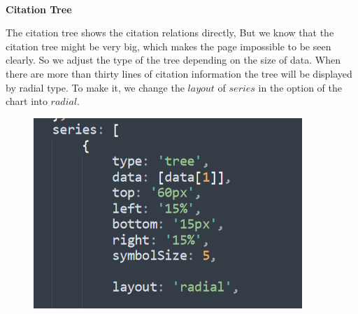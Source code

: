 \documentclass{article}
\begin{document}
	\\
	\textbf{Citation Tree}
	\par The citation tree shows the citation relations directly, But we know that the citation tree might be very big, which makes the page impossible to be seen clearly. So we adjust the type of the tree depending on the size of data. When there are more than thirty lines of citation information the tree will be displayed by radial type. To make it, we change the \(layout\) of \(series\) in the option of the chart into \(radial\).
	\begin{figure}[H]
		\centering
		\includegraphics[width=0.25\linewidth]{P_37.png}
	\end{figure}
\end{document}
